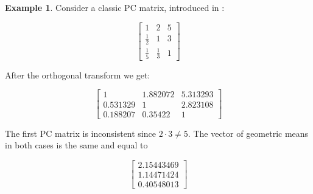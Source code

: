 \documentclass [12pt]{article}
\theoremstyle{definition}
\newtheorem{ex}{\bf Example}
\begin{document}
\begin{ex}
Consider a classic PC matrix, introduced in \cite{Kocz93}:

$$
\begin{bmatrix}
1 & 2 & 5 \\ 
\frac{1}{2} & 1 & 3 \\ 
\frac{1}{5} & \frac{1}{3} & 1
\end{bmatrix} 
$$

After the orthogonal transform we get:

$$
\begin{bmatrix}
1 & 1.882072 & 5.313293 \\ 
0.531329 & 1 & 2.823108 \\ 
0.188207 & 0.35422 & 1
\end{bmatrix} 
$$


The first PC matrix is inconsistent since $2 \cdot 3 \ne 5$. The vector of geometric means in both cases is the same and equal to 

$$
\begin{bmatrix}
2.15443469 \\ 
1.14471424 \\ 
0.40548013
\end{bmatrix} 
$$

\end{ex}
\end{document}
